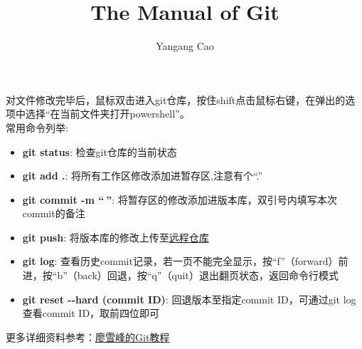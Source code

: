 \documentclass{article}
\author{Yangang Cao}
\begin{document}
	\title{The Manual of Git}
	\maketitle
	\noindent 对文件修改完毕后，鼠标双击进入git仓库，按住shift点击鼠标右键，在弹出的选项中选择“在当前文件夹打开powershell”。
	\newline
	\\常用命令列举: 
	\begin{itemize}
\item{\bfseries git status}: 检查git仓库的当前状态
\item{\bfseries git add .}: 将所有工作区修改添加进暂存区,注意有个“.”
\item{\bfseries git commit -m “$\ $”}: 将暂存区的修改添加进版本库，双引号内填写本次commit的备注
\item{\bfseries git push}: 将版本库的修改上传至\href{https://github.com}{远程仓库}
\item{\bfseries git log}: 查看历史commit记录，若一页不能完全显示，按“f”（forward）前进，按“b”（back）回退，按“q”（quit）退出翻页状态，返回命令行模式
\item{\bfseries git reset -\/-hard (commit ID)}: 回退版本至指定commit ID，可通过git log查看commit ID，取前四位即可
	\end{itemize}
更多详细资料参考：\href{https://www.liaoxuefeng.com/wiki/0013739516305929606dd18361248578c67b8067c8c017b000}{廖雪峰的Git教程} 
\end{document}
